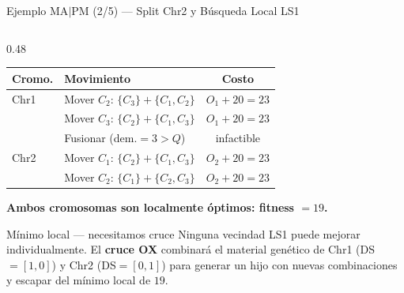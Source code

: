 \documentclass[aspectratio=169,10pt]{beamer}
\begin{document}
\begin{frame}{Ejemplo MA$|$PM (2/5) --- Split Chr2 y Búsqueda Local LS1}
\begin{columns}[T,onlytextwidth]
\begin{column}{0.48\textwidth}
\begin{center}
\begin{tabular}{llc}
        \toprule
        Cromo. & Movimiento & Costo \\
        \midrule
        Chr1 & Mover $C_2$: $\{C_3\}{+}\{C_1,C_2\}$ & $O_1{+}20=23$ \\
             & Mover $C_3$: $\{C_2\}{+}\{C_1,C_3\}$ & $O_1{+}20=23$ \\
             & Fusionar (dem.$=3>Q$) & infactible \\
        \midrule
        Chr2 & Mover $C_1$: $\{C_2\}{+}\{C_1,C_3\}$ & $O_2{+}20=23$ \\
             & Mover $C_2$: $\{C_1\}{+}\{C_2,C_3\}$ & $O_2{+}20=23$ \\
        \bottomrule
      \end{tabular}
      \end{center}
      \vspace{0.1em}
      \small \textbf{Ambos cromosomas son localmente óptimos: fitness $= 19$.}

      \vspace{0.2em}
      \begin{alertblock}{Mínimo local — necesitamos cruce}\small
        Ninguna vecindad LS1 puede mejorar individualmente. El \textbf{cruce OX} combinará el material genético de Chr1 (DS$=[1,0]$) y Chr2 (DS$=[0,1]$) para generar un hijo con nuevas combinaciones y escapar del mínimo local de $19$.
      \end{alertblock}
    \end{column}
  \end{columns}
\end{frame}
\end{document}
